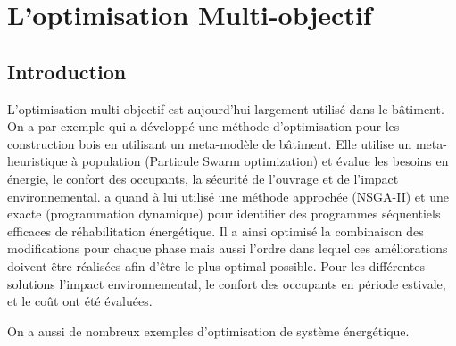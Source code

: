 



\section{L’optimisation Multi-objectif} %
\label{sec:multi_critere}

\subsection{Introduction} %
\label{sub:introduction}

L’optimisation multi-objectif est aujourd’hui largement utilisé dans le bâtiment.
On a par exemple \cite{Armand-Decker2015} qui a développé une méthode d’optimisation pour les
construction bois en utilisant un meta-modèle de bâtiment. Elle utilise un meta-heuristique
à population (Particule Swarm optimization) et évalue les besoins en énergie, le confort des
occupants, la sécurité de l’ouvrage et de l’impact environnemental. \cite{Rivallain2013}
a quand à lui utilisé une méthode approchée (NSGA-II) et une exacte (programmation dynamique)
pour identifier des programmes séquentiels efficaces de réhabilitation énergétique.
Il a ainsi optimisé la combinaison des modifications pour chaque phase mais aussi l’ordre
dans lequel ces améliorations doivent être réalisées afin d’être le plus optimal
possible.
Pour les différentes solutions l’impact environnemental, le confort des occupants en
période estivale, et le coût ont été évaluées.

On a aussi de nombreux exemples d’optimisation de système énergétique.


